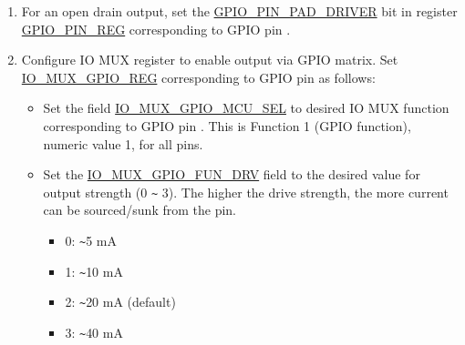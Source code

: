 \documentclass[main\_\_EN.tex]{subfiles}
\begin{document}
\begin{enumerate}
    
    \begin{itemize}
        \item Set the \hyperref[fielddesc:GPIOFUNCNOUTSEL]{GPIO\_FUNC\_OUT\_SEL} field in register \hyperref[regdesc:GPIOFUNCNOUTSELCFGREG]{GPIO\_FUNC\_OUT\_SEL\_CFG\_REG} to the index of the desired peripheral output signal .
        \item If the signal should always be enabled as an output, set the \hyperref[fielddesc:GPIOFUNCNOENSEL]{GPIO\_FUNC\_OEN\_SEL} bit in register \hyperref[regdesc:GPIOFUNCNOUTSELCFGREG]{GPIO\_FUNC\_OUT\_SEL\_CFG\_REG} and the bit in register \hyperref[regdesc:GPIOENABLEW1TSREG]{GPIO\_ENABLE\_W1TS\_REG}, corresponding to GPIO pin . To have the output enable signal decided by internal logic (for example, the SPIQ\_oe in column ``Output enable signal when \hyperref[fielddesc:GPIOFUNCNOENSEL]{GPIO\_FUNC\_OEN\_SEL} = 0" in Table \ref{tab:iomuxgpio-periph-signals-via-gpio-matrix}), clear the \hyperref[fielddesc:GPIOFUNCNOENSEL]{GPIO\_FUNC\_OEN\_SEL} bit instead.
       \item Set the corresponding bit in register \hyperref[regdesc:GPIOENABLEW1TCREG]{GPIO\_ENABLE\_W1TC\_REG} to disable the output from the GPIO pin.
    \end{itemize}
    \item For an open drain output, set the \hyperref[fielddesc:GPIOPINNPADDRIVER]{GPIO\_PIN\_PAD\_DRIVER} bit in register \hyperref[regdesc:GPIOPINNREG]{GPIO\_PIN\_REG} corresponding to GPIO pin .
    \item Configure IO MUX register to enable output via GPIO matrix. Set \hyperref[regdesc:IOMUXGPIONREG]{IO\_MUX\_GPIO\_REG} corresponding to GPIO pin  as follows:
    \begin{itemize}
        \item Set the field \hyperref[fielddesc:IOMUXGPIONMCUSEL]{IO\_MUX\_GPIO\_MCU\_SEL} to desired IO MUX function corresponding to GPIO pin . This is Function 1 (GPIO function), numeric value 1, for all pins.
        \item Set the \hyperref[fielddesc:IOMUXGPIONFUNDRV]{IO\_MUX\_GPIO\_FUN\_DRV} field to the desired value for output strength (0 \verb+~+ 3). The higher the drive strength, the more current can be sourced/sunk from the pin.
        \begin{itemize}
            \item 0: \verb+~+5 mA
            \item 1: \verb+~+10 mA
            \item 2: \verb+~+20 mA (default)
            \item 3: \verb+~+40 mA
        \end{itemize}
        

\end{itemize}
\end{enumerate}
\end{document}
